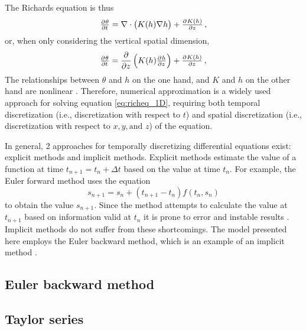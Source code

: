 The Richards equation is thus
\begin{equation}
  \label{eq:richeq_3D}
  \pd{\theta}{t} = \nabla \cdot \del{ K(h) \nabla h } + \pd{K(h)}{z} \, ,
\end{equation}
or, when only considering the vertical spatial dimension,
\begin{equation}
  \label{eq:richeq_1D}
  \pd{\theta}{t} = \frac{\partial}{\partial z} \del{ K(h) \pd{h}{z} } + \pd{K(h)}{z} \, ,
\end{equation}
The relationships between $\theta$ and $h$ on the one hand, and $K$ and $h$ on the other hand are nonlinear \parencite{celia_general_1990}.  Therefore, numerical approximation is a widely used approach for solving equation \eqref{eq:richeq_1D}, requiring both temporal discretization (i.e., discretization with respect to $t$) and spatial discretization (i.e., discretization with respect to $x, y, \text{and } z$) of the equation.

In general, 2 approaches for temporally discretizing differential equations exist:  explicit methods and implicit methods.  Explicit methods estimate the value of a function at time $t_{n+1} = t_n + \Delta t$ based on the value at time $t_n$. For example, the Euler forward method uses the equation
\begin{equation}
  \label{eq:euformeth}
  s_{n+1} = s_n + (t_{n+1} - t_n) f(t_n,s_n)
\end{equation}
to obtain the value $s_{n+1}$.  Since the method attempts to calculate the value at $t_{n+1}$ based on information valid at $t_n$ it is prone to error and instable results \parencite{Weisstein2017a}.  Implicit methods do not suffer from these shortcomings.  The model presented here employs the Euler backward method, which is an example of an implicit method \parencite{Weisstein2017b}.

\subsection{Euler backward method}


\subsection{Taylor series}


